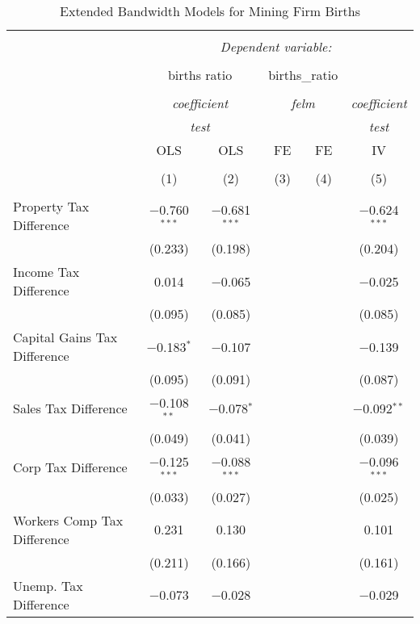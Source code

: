 
\begin{table}[!htbp] \centering 
  \caption{Extended Bandwidth Models for  Mining Firm Births} 
  \label{} 
\begin{tabular}{@{\extracolsep{5pt}}lccccc} 
\\[-1.8ex]\hline 
\hline \\[-1.8ex] 
 & \multicolumn{5}{c}{\textit{Dependent variable:}} \\ 
\cline{2-6} 
\\[-1.8ex] & \multicolumn{2}{c}{births ratio} & \multicolumn{2}{c}{births\_ratio} &   \\ 
\\[-1.8ex] & \multicolumn{2}{c}{\textit{coefficient}} & \multicolumn{2}{c}{\textit{felm}} & \textit{coefficient} \\ 
 & \multicolumn{2}{c}{\textit{test}} & \multicolumn{2}{c}{\textit{}} & \textit{test} \\ 
 & OLS & OLS & FE & FE & IV \\ 
\\[-1.8ex] & (1) & (2) & (3) & (4) & (5)\\ 
\hline \\[-1.8ex] 
 Property Tax Difference & $-$0.760$^{***}$ & $-$0.681$^{***}$ &  &  & $-$0.624$^{***}$ \\ 
  & (0.233) & (0.198) &  &  & (0.204) \\ 
  Income Tax Difference & 0.014 & $-$0.065 &  &  & $-$0.025 \\ 
  & (0.095) & (0.085) &  &  & (0.085) \\ 
  Capital Gains Tax Difference & $-$0.183$^{*}$ & $-$0.107 &  &  & $-$0.139 \\ 
  & (0.095) & (0.091) &  &  & (0.087) \\ 
  Sales Tax Difference & $-$0.108$^{**}$ & $-$0.078$^{*}$ &  &  & $-$0.092$^{**}$ \\ 
  & (0.049) & (0.041) &  &  & (0.039) \\ 
  Corp Tax Difference & $-$0.125$^{***}$ & $-$0.088$^{***}$ &  &  & $-$0.096$^{***}$ \\ 
  & (0.033) & (0.027) &  &  & (0.025) \\ 
  Workers Comp Tax Difference & 0.231 & 0.130 &  &  & 0.101 \\ 
  & (0.211) & (0.166) &  &  & (0.161) \\ 
  Unemp. Tax Difference & $-$0.073 & $-$0.028 &  &  & $-$0.029 \\ 

\end{tabular}
\end{table}
